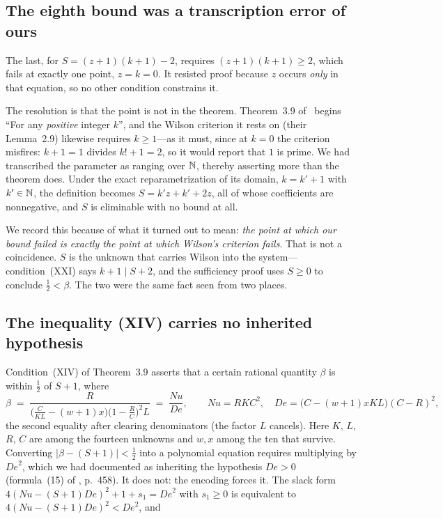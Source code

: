\subsection{The eighth bound was a transcription error of ours}

The last, for $S=(z+1)(k+1)-2$, requires $(z+1)(k+1)\ge2$, which fails at
exactly one point, $z=k=0$. It resisted proof because $z$ occurs \emph{only} in
that equation, so no other condition constrains it.

The resolution is that the point is not in the theorem. Theorem~3.9
of~\cite{jsww1976} begins ``For any \emph{positive} integer $k$'', and the
Wilson criterion it rests on (their Lemma~2.9) likewise requires $k\ge1$---as it
must, since at $k=0$ the criterion misfires: $k+1=1$ divides $k!+1=2$, so it
would report that $1$ is prime. We had transcribed the parameter as ranging over
$\mathbb{N}$, thereby asserting more than the theorem does. Under the exact
reparametrization of its domain, $k=k'+1$ with $k'\in\mathbb{N}$, the definition becomes
$S=k'z+k'+2z$, all of whose coefficients are nonnegative, and $S$ is eliminable
with no bound at all.

We record this because of what it turned out to mean: \emph{the point at which
our bound failed is exactly the point at which Wilson's criterion fails}. That
is not a coincidence. $S$ is the unknown that carries Wilson into the system---
condition~(XXI) says $k+1\mid S+2$, and the sufficiency proof uses $S\ge0$ to
conclude $\tfrac12<\beta$. The two were the same fact seen from two places.

\subsection{The inequality (XIV) carries no inherited hypothesis}

Condition~(XIV) of Theorem~3.9 asserts that a certain rational quantity
$\beta$ is within $\tfrac12$ of $S+1$, where
\[
  \beta \;=\; \frac{R}{\bigl(\tfrac{C}{KL}-(w+1)x\bigr)\bigl(1-\tfrac{R}{C}\bigr)^2 L}
        \;=\; \frac{\mathit{Nu}}{\mathit{De}}, \qquad
  \mathit{Nu}=RKC^2,\quad
  \mathit{De}=\bigl(C-(w+1)xKL\bigr)(C-R)^2 ,
\]
the second equality after clearing denominators (the factor $L$ cancels). Here
$K$, $L$, $R$, $C$ are among the fourteen unknowns and $w,x$ among the ten that
survive. Converting $|\beta-(S{+}1)|<\tfrac12$ into a polynomial equation
requires multiplying by $\mathit{De}^2$, which we had documented as inheriting
the hypothesis $\mathit{De}>0$ (formula~(15) of \cite{jsww1976}, p.~458). It
does not: the encoding forces it. The slack form
$4(\mathit{Nu}-(S{+}1)\mathit{De})^2+1+s_1=\mathit{De}^2$ with $s_1\ge0$ is
equivalent to $4(\mathit{Nu}-(S{+}1)\mathit{De})^2<\mathit{De}^2$, and

